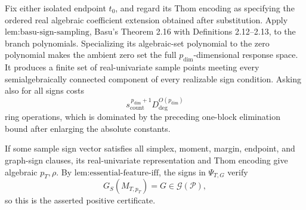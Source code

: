 Fix either isolated endpoint \(t_0\), and regard its Thom encoding as specifying the ordered real algebraic coefficient extension obtained after substitution.  Apply \(\text{lem:basu-sign-sampling}\), Basu's Theorem 2.16 with Definitions 2.12--2.13, to the branch polynomials.  Specializing its algebraic-set polynomial to the zero polynomial makes the ambient zero set the full \(p_{\mathrm{dim}}\)-dimensional response space.  It produces a finite set of real-univariate sample points meeting every semialgebraically connected component of every realizable sign condition.  Asking also for all signs costs
\[
s_{\mathrm{count}}^{\,p_{\mathrm{dim}}+1}
D_{\mathrm{deg}}^{O(p_{\mathrm{dim}})}
\]
ring operations, which is dominated by the preceding one-block elimination bound after enlarging the absolute constants.

If some sample sign vector satisfies all simplex, moment, margin, endpoint, and graph-sign clauses, its real-univariate representation and Thom encoding give algebraic \(p_T,\rho\).  By \(\text{lem:essential-feature-iff}\), the signs in \(\Psi_{T,G}\) verify
\[
G_S(M_{T,p_T})=G\in\mathcal G(\mathcal P),
\]
so this is the asserted positive certificate.

